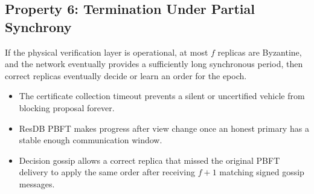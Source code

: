 \documentclass[fleqn,10pt]{olplainarticle}
\begin{document}
\subsection{Property 6: Termination Under Partial Synchrony}

If the physical verification layer is operational, at most $f$ replicas are Byzantine, and the network eventually provides a sufficiently long synchronous period, then correct replicas eventually decide or learn an order for the epoch.

\begin{itemize}
    \item The certificate collection timeout prevents a silent or uncertified vehicle from blocking proposal forever.
    \item ResDB PBFT makes progress after view change once an honest primary has a stable enough communication window.
    \item Decision gossip allows a correct replica that missed the original PBFT delivery to apply the same order after receiving $f+1$ matching signed gossip messages.
\end{itemize}





\end{document}
